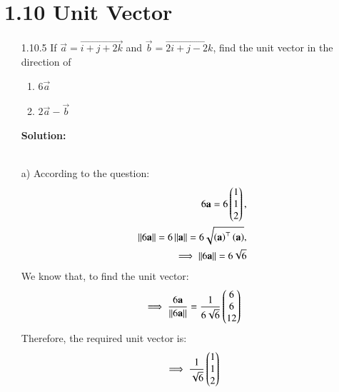 \documentclass[journal]{IEEEtran}
\begin{document}
\section{1.10 Unit Vector}
\begin{enumerate}
\item [1.10.5] If $\vec{a} =\vec{i+j+2k}$ and $\vec{b} = \vec{2i+j-2k}$, find the unit vector in the direction of
\begin{enumerate}
    \item $6\vec{a}$
    \item $2\vec{a}-\vec{b}$
\end{enumerate}
\textbf{Solution:}
\begin{table}[h!]    
      \centering
      
      \caption{}
    \end{table}\\
a) According to the question:
\begin{align}
    6\mathbf{a} = 6\begin{pmatrix}1\\1\\2\end{pmatrix},\\
    \left\vert\left\vert6\mathbf{a}\right\vert\right\vert = 6\left\vert\left\vert\mathbf{a}\right\vert\right\vert = 6\sqrt{{\left(\mathbf{a}\right)^\top\left(\mathbf{a}\right)}},\\
    \implies \left\vert\left\vert6\mathbf{a}\right\vert\right\vert = 6\sqrt{6}
\end{align}
We know that, to find the unit vector:
\begin{align}
    \implies \frac{6\mathbf{a}}{\left\vert\left\vert6\mathbf{a}\right\vert\right\vert} = \frac{1}{6\sqrt{6}}\begin{pmatrix}6\\6\\12\end{pmatrix}
\end{align}
Therefore, the required unit vector is:
\begin{align}
    \implies \frac{1}{\sqrt{6}}\begin{pmatrix}1\\1\\2\end{pmatrix}
\end{align}


\end{enumerate}
\end{document}
